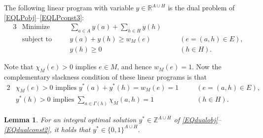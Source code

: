 \documentclass[10pt,a4paper]{amsart}
\newtheorem{lemma}{Lemma}
\newcommand{\RR}{{\mathbb{R}}}
\newcommand{\ZZ}{{\mathbb{Z}}}
\begin{document}
The following linear program with variable $y\in \RR^{A\cup H} $ is the dual problem of \eqref{EQLPobj}--\eqref{EQLPconst3}: 
\begin{alignat}{3}
\label{EQdualobj}
&\mbox{Minimize}    &\quad& \sum_{a\in A} y(a) + \sum_{h\in H} y(h)     && \\
\label{EQdualconst1}
&\mbox{subject to}  &\quad& y(a) + y(h) \ge w_M(e)                    &\quad& (e=(a,h)\in E),\\
\label{EQdualconst2}
&                   &\quad& y(h)\ge 0                                   &\quad& (h\in H).
\end{alignat}

Note that $\chi_M(e) > 0$ implies $e\in M$, and hence $w_M(e)=1$. 
Now 
the complementary slackness condition of these linear programs is that 
\begin{alignat}{2}
    \label{EQCS1}
    &{}\mbox{$\chi_M(e) > 0$ implies $y^*(a)+y^*(h)= w_M(e)=1$}& \quad &(e=(a,h)\in E),\\
    \label{EQCS2}
    &{}\mbox{$y^*(h) > 0$ implies $\displaystyle\sum_{a\in \Gamma(h)}\chi_M(a,h)= 1$}& \quad& (h\in H).
\end{alignat}

\begin{lemma}
\label{LEMy01}
    For an integral optimal solution $y^* \in \ZZ^{A\cup H}$ of \eqref{EQdualobj}--\eqref{EQdualconst2}, 
    it holds that $y^* \in \{0,1\}^{A\cup H}$. 
\end{lemma}
\end{document}
